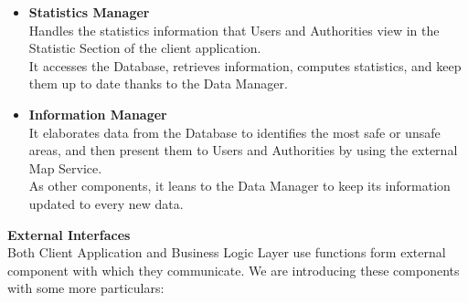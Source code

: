 \begin{itemize}
     \item\textbf{Statistics Manager}\\
     Handles the statistics information that Users and Authorities view in the Statistic Section of the client application.\\
     It accesses the Database, retrieves information, computes statistics, and keep them up to date thanks to the Data Manager.
     
     \item\textbf{Information Manager}\\
     It elaborates data from the Database to identifies the most safe or unsafe areas, and then present them to Users and Authorities by using the external Map Service.\\
     As other components, it leans to the Data Manager to keep its information updated to every new data.
     
\end{itemize}

\noindent\textbf{External Interfaces}\\
Both Client Application and Business Logic Layer use functions form external component with which they communicate. We are introducing these components with some more particulars:

